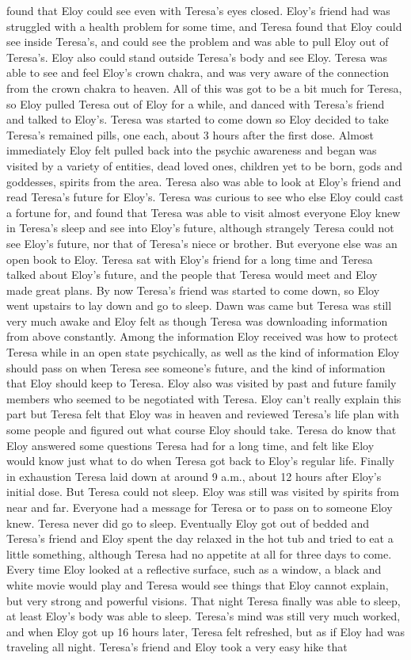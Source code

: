\documentclass[12pt]{book}
\begin{document}
found that Eloy could see even with Teresa's eyes closed. Eloy's friend had was struggled with a health problem for some time, and Teresa found that Eloy could see inside Teresa's, and could see the problem and was able to pull Eloy out of Teresa's. Eloy also could stand outside Teresa's body and see Eloy. Teresa was able to see and feel Eloy's crown chakra, and was very aware of the connection from the crown chakra to heaven. All of this was got to be a bit much for Teresa, so Eloy pulled Teresa out of Eloy for a while, and danced with Teresa's friend and talked to Eloy's. Teresa was started to come down so Eloy decided to take Teresa's remained pills, one each, about 3 hours after the first dose. Almost immediately Eloy felt pulled back into the psychic awareness and began was visited by a variety of entities, dead loved ones, children yet to be born, gods and goddesses, spirits from the area. Teresa also was able to look at Eloy's friend and read Teresa's future for Eloy's. Teresa was curious to see who else Eloy could cast a fortune for, and found that Teresa was able to visit almost everyone Eloy knew in Teresa's sleep and see into Eloy's future, although strangely Teresa could not see Eloy's future, nor that of Teresa's niece or brother. But everyone else was an open book to Eloy. Teresa sat with Eloy's friend for a long time and Teresa talked about Eloy's future, and the people that Teresa would meet and Eloy made great plans. By now Teresa's friend was started to come down, so Eloy went upstairs to lay down and go to sleep. Dawn was came but Teresa was still very much awake and Eloy felt as though Teresa was downloading information from above constantly. Among the information Eloy received was how to protect Teresa while in an open state psychically, as well as the kind of information Eloy should pass on when Teresa see someone's future, and the kind of information that Eloy should keep to Teresa. Eloy also was visited by past and future family members who seemed to be negotiated with Teresa. Eloy can't really explain this part but Teresa felt that Eloy was in heaven and reviewed Teresa's life plan with some people and figured out what course Eloy should take. Teresa do know that Eloy answered some questions Teresa had for a long time, and felt like Eloy would know just what to do when Teresa got back to Eloy's regular life. Finally in exhaustion Teresa laid down at around 9 a.m., about 12 hours after Eloy's initial dose. But Teresa could not sleep. Eloy was still was visited by spirits from near and far. Everyone had a message for Teresa or to pass on to someone Eloy knew. Teresa never did go to sleep. Eventually Eloy got out of bedded and Teresa's friend and Eloy spent the day relaxed in the hot tub and tried to eat a little something, although Teresa had no appetite at all for three days to come. Every time Eloy looked at a reflective surface, such as a window, a black and white movie would play and Teresa would see things that Eloy cannot explain, but very strong and powerful visions. That night Teresa finally was able to sleep, at least Eloy's body was able to sleep. Teresa's mind was still very much worked, and when Eloy got up 16 hours later, Teresa felt refreshed, but as if Eloy had was traveling all night. Teresa's friend and Eloy took a very easy hike that 
\end{document}
